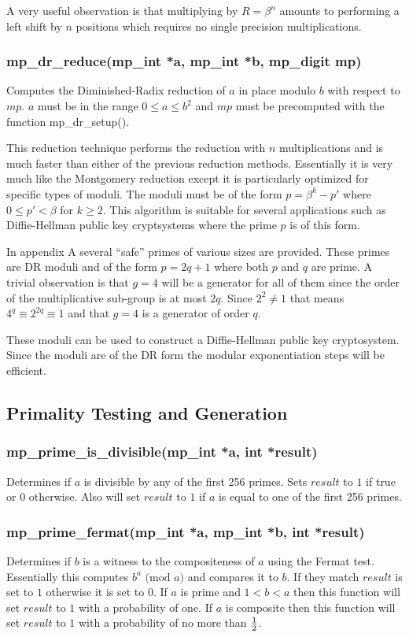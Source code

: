 \documentclass{article}
\begin{document}
A very useful observation is that multiplying by $R = \beta^n$ amounts to performing a left shift by $n$ positions which
requires no single precision multiplications.

\subsubsection{mp\_dr\_reduce(mp\_int *a, mp\_int *b, mp\_digit mp)}
Computes the Diminished-Radix reduction of $a$ in place modulo $b$ with respect to $mp$.  $a$ must be in the range 
$0 \le a \le b^2$ and $mp$ must be precomputed with the function mp\_dr\_setup().

This reduction technique performs the reduction with $n$ multiplications and is much faster than either of the previous
reduction methods.  Essentially it is very much like the Montgomery reduction except it is particularly optimized for
specific types of moduli.  The moduli must be of the form $p = \beta^k - p'$ where $0 \le p' < \beta$ for $k \ge 2$.  
This algorithm is suitable for several applications such as Diffie-Hellman public key cryptsystems where the prime $p$ is 
of this form.

In appendix A several ``safe'' primes of various sizes are provided.  These primes are DR moduli and of the form 
$p = 2q + 1$ where both $p$ and $q$ are prime.  A trivial observation is that $g = 4$ will be a generator for all of them
since the order of the multiplicative sub-group is at most $2q$.  Since $2^2 \ne 1$ that means $4^q \equiv 2^{2q} \equiv 1$ 
and that $g = 4$ is a generator of order $q$.

These moduli can be used to construct a Diffie-Hellman public key cryptosystem.  Since the moduli are of the
DR form the modular exponentiation steps will be efficient.

\subsection{Primality Testing and Generation}

\subsubsection{mp\_prime\_is\_divisible(mp\_int *a, int *result)}
Determines if $a$ is divisible by any of the first 256 primes.  Sets $result$ to $1$ if true or $0$ 
otherwise.  Also will set $result$ to $1$ if $a$ is equal to one of the first 256 primes.  

\subsubsection{mp\_prime\_fermat(mp\_int *a, mp\_int *b, int *result)}
Determines if $b$ is a witness to the compositeness of $a$ using the Fermat test.  Essentially this
computes $b^a \mbox{ (mod }a\mbox{)}$ and compares it to $b$.  If they match $result$ is set
to $1$ otherwise it is set to $0$.  If $a$ is prime and $1 < b < a$ then this function will set 
$result$ to $1$ with a probability of one.  If $a$ is composite then this function will set 
$result$ to $1$ with a probability of no more than $1 \over 2$.  
\end{document}
